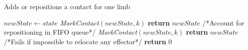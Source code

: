 \begin{algorithm}[!tbp]
\caption{Adds or repositions a contact for one limb} \label{interpolate}
	\begin{algorithmic}[1]
        \State $newState \gets state$
				\State \textit{MarkContact}$(newState,k)$			
				\State \textbf{return} $newState$
			\EndIf
		\EndFor
				\State /*Account for repositioning in FIFO queue*/		
				\State \textit{MarkContact}$(newState,k)$
				\State \textbf{return} $newState$
			\EndIf
		\EndFor
        \State
		/*Fails if impossible to relocate any effector*/
		\State \textbf{return} $0$
	\EndFunction
\end{algorithmic}
\label{alg:repo}
\end{algorithm}

